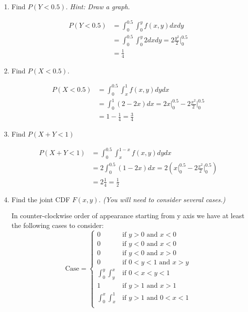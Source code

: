 \documentclass{article}
\newcommand{\1}{\mathbf{1}}
\begin{document}
\begin{enumerate}
    \item Find $P(Y<0.5)$. {\it Hint: Draw a graph.}  

    \begin{align*}
        P(Y<0.5) &= \int_0^{0.5} \int_0^y f(x,y)dxdy \\
        &= \int_0^{0.5} \int_0^y 2 dxdy = 2 \frac{y^2}{2}\bigg |_0^{0.5} \\
        &= \frac{1}{4}
    \end{align*}


    \item Find $P(X<0.5)$. 
    
    \begin{align*}
        P(X<0.5) &= \int_0^{0.5}\int_x^1 f(x,y)dydx \\
        &= \int_0^1 (2-2x) dx = 2x|_0^{0.5} -  2\frac{x^2}{2}\bigg |_0^{0.5} \\
        &= 1 - \frac{1}{4} = \frac{3}{4}
    \end{align*}
    
    
    \item Find $P(X+Y < 1)$ 
    
    \begin{align*}
        P(X+Y<1) &= \int_0^{0.5}\int_x^{1-x} f(x,y)dydx \\
        &= 2\int_0^{0.5} (1-2x) dx = 2\left(x|_0^{0.5} -  2\frac{x^2}{2}\bigg |_0^{0.5}\right) \\
        &= 2\frac{1}{4} = \frac{1}{2}
    \end{align*}
        
    \newpage
    \item Find the joint CDF $F(x,y)$. {\it (You will need to consider several cases.)}  
    
    In counter-clockwise order of appearance starting from y axis we have at least the following cases to consider:
    $$
    \mbox{Case} = \begin{cases} 
	        0                   &\mbox{if } y > 0     \mbox{ and } x < 0 \\
	        0                   &\mbox{if } y < 0     \mbox{ and } x < 0 \\
	        0                   &\mbox{if } y < 0     \mbox{ and } x > 0 \\
	        0                   &\mbox{if } 0 < y < 1 \mbox{ and } x > y \\
	        \int_0^y \int_y^x   &\mbox{if } 0 < x < y < 1 \\
	        1                   &\mbox{if } y > 1     \mbox{ and } x > 1 \\
	        \int_0^x \int_x^1   &\mbox{if } y > 1     \mbox{ and } 0 < x < 1 \\
        \end{cases}
    $$
    

\end{enumerate}
\end{document}
